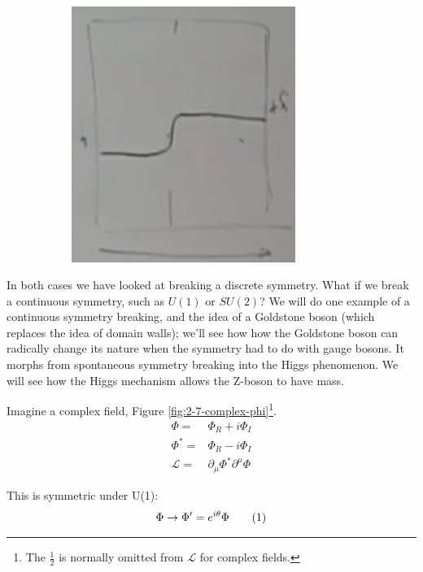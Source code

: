 \documentclass[]{article}
\newcommand\numberthis{\addtocounter{equation}{1}\tag{\theequation}}
\begin{document}
\begin{figure}[H]
\begin{subfigure}[t]{0.9\textwidth}
\begin{center}
			\includegraphics[width=0.8\textwidth]{2-7-V-domain-wall}
		\end{center}
	\end{subfigure}
\end{figure}

In both cases we have looked at breaking a discrete symmetry. What if we break a continuous symmetry, such as $U(1)$ or $SU(2)$? We will do one example of a continuous symmetry breaking, and the idea of a Goldstone boson (which replaces the idea of domain walls); we'll see how how the Goldstone boson can radically change its nature when the symmetry had to do with gauge bosons. It morphs from spontaneous symmetry breaking into the Higgs phenomenon. We will see how the Higgs mechanism allows the Z-boson to have mass.


Imagine a complex field, Figure \ref{fig:2-7-complex-phi}\footnote{The $\frac{1}{2}$ is normally omitted from $\mathcal{L}$ for complex fields.}.
\begin{align*}
	\Phi =& \Phi_R + i \Phi_I \\
	\Phi^* =& \Phi_R - i \Phi_I\\
	\mathcal{L} =&  \partial_\mu \Phi^* \partial^\mu \Phi 
\end{align*}

This is symmetric under U(1):
\begin{align*}
	\Phi \rightarrow \Phi^\prime=e^{i \theta} \Phi  \numberthis \label{eq:U1:theta}
\end{align*}
\end{document}
